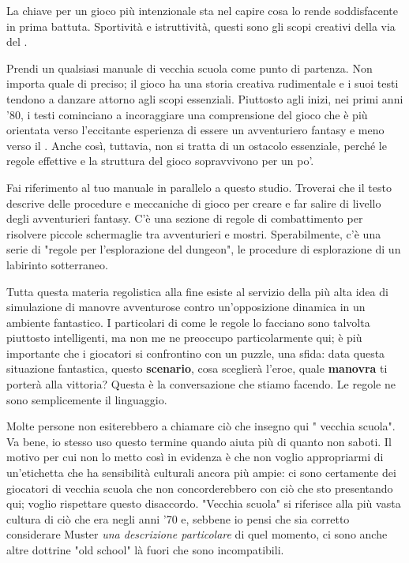 La chiave per un gioco più intenzionale sta nel capire cosa lo rende soddisfacente in prima battuta. Sportività e istruttività, questi sono gli scopi creativi della via del .




Prendi un qualsiasi manuale di \dnd{} vecchia scuola come punto di partenza. Non importa quale di preciso; il gioco ha una storia creativa rudimentale e i suoi testi tendono a danzare attorno agli scopi essenziali. Piuttosto agli inizi, nei primi anni '80, i testi cominciano a incoraggiare una comprensione del gioco che è più orientata verso l'eccitante esperienza di essere un avventuriero fantasy e meno verso il . Anche così, tuttavia, non si tratta di un ostacolo essenziale, perché le regole effettive e la struttura del gioco sopravvivono per un po'.

Fai riferimento al tuo manuale in parallelo a questo studio. Troverai che il testo descrive delle procedure e meccaniche di gioco per creare e far salire di livello degli avventurieri fantasy. C'è una sezione di regole di combattimento per risolvere piccole schermaglie tra avventurieri e mostri. Sperabilmente, c'è una serie di "regole per l'esplorazione del dungeon", le procedure di esplorazione di un labirinto sotterraneo.

Tutta questa materia regolistica alla fine esiste al servizio della più alta idea di simulazione di manovre avventurose contro un'opposizione dinamica in un ambiente fantastico. I particolari di come le regole lo facciano sono talvolta piuttosto intelligenti, ma non me ne preoccupo particolarmente qui; è più importante che i giocatori si confrontino con un puzzle, una sfida: data questa situazione fantastica, questo \textbf{scenario}, cosa sceglierà l'eroe, quale \textbf{manovra} ti porterà alla vittoria? Questa è la conversazione che stiamo facendo. Le regole ne sono semplicemente il linguaggio.


Molte persone non esiterebbero a chiamare ciò che insegno qui "\dnd{} vecchia scuola". Va bene, io stesso uso questo termine quando aiuta più di quanto non saboti. Il motivo per cui non lo metto così in evidenza è che non voglio appropriarmi di un'etichetta che ha sensibilità culturali ancora più ampie: ci sono certamente dei giocatori di \dnd{} vecchia scuola che non concorderebbero con ciò che sto presentando qui; voglio rispettare questo disaccordo. "Vecchia scuola" si riferisce alla più vasta cultura di ciò che \dnd{} era negli anni '70 e, sebbene io pensi che sia corretto considerare Muster \textit{una descrizione particolare} di quel momento, ci sono anche altre dottrine "old school" là fuori che sono incompatibili.

